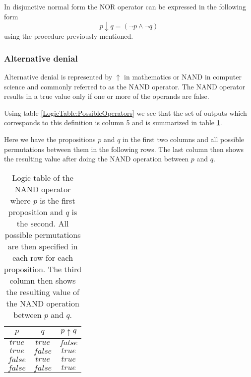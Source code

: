                 In disjunctive normal form the NOR operator can be expressed in the following form
                \begin{equation}
                    p \downarrow q = (\neg p \wedge \neg q)
                \end{equation}
                using the procedure previously mentioned.
                
            \subsubsection{Alternative denial}
                Alternative denial is represented by $\uparrow$ in mathematics or NAND in computer science and commonly referred to as the NAND operator. The NAND operator results in a true value only if one or more of the operands are false.
                
                Using table \ref{LogicTable:PossibleOperators} we see that the set of outputs which corresponds to this definition is column 5 and is summarized in table \ref{LogicTable:NAND}.
                
                Here we have the propositions $p$ and $q$ in the first two columns and all possible permutations between them in the following rows. The last column then shows the resulting value after doing the NAND operation between $p$ and $q$.
                
                \begin{table}[h!]
                    \centering
                    \begin{tabular}{|c|c|c|}
                    	\hline
                    	  $p$   &   $q$   & $p \uparrow q$ \\ \hline
                    	$true$  & $true$  &    $false$     \\ \hline
                    	$true$  & $false$ &     $true$     \\ \hline
                    	$false$ & $true$  &     $true$     \\ \hline
                    	$false$ & $false$ &     $true$     \\ \hline
                    \end{tabular}
                    \caption{Logic table of the NAND operator where $p$ is the first proposition and $q$ is the second. All possible permutations are then specified in each row for each proposition. The third column then shows the resulting value of the NAND operation between $p$ and $q$.}
                    \label{LogicTable:NAND}
                \end{table}
            
